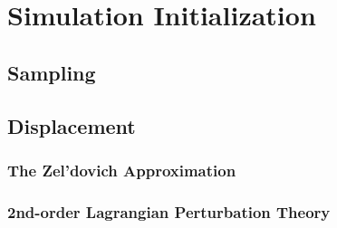 
\section{Simulation Initialization}
\label{sec:initialization}



\subsection{Sampling}



\subsection{Displacement}


\subsubsection{The Zel'dovich Approximation}


\subsubsection{2nd-order Lagrangian Perturbation Theory}



